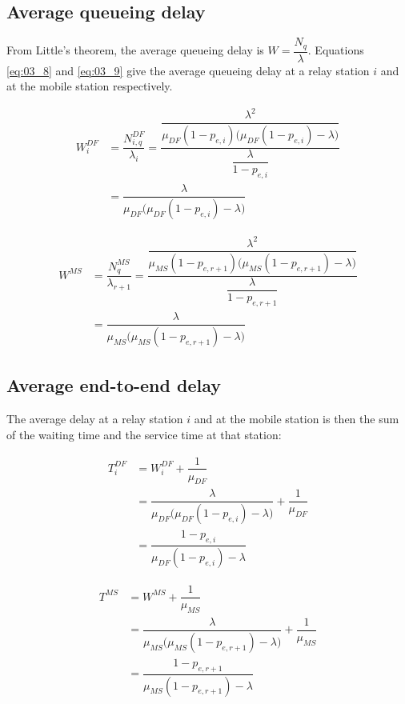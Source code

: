 \subsection{Average queueing delay}

From Little's theorem, the average queueing delay is $W = \dfrac{N_q}{\lambda}$.
Equations \ref{eq:03_8} and \ref{eq:03_9} give the average queueing delay at a
relay station $i$ and at the mobile station respectively.

\begin{align}
  W_i^{DF} &= \dfrac{N_{i,q}^{DF}}{\lambda_i} =
    \dfrac{\dfrac{\lambda^2}{\mu_{DF}(1 - p_{e,i})\Big(\mu_{DF}(1 - p_{e,i}) - \lambda\Big)}} {\dfrac{\lambda}{1-p_{e,i}}} \nonumber \\
         ~ &= \dfrac{\lambda}{\mu_{DF}\Big(\mu_{DF}(1 - p_{e,i})- \lambda\Big)}
  \label{eq:03_8}
\end{align}

\begin{align}
  W^{MS} &= \dfrac{N_q^{MS}}{\lambda_{r+1}} =
    \dfrac{\dfrac{\lambda^2}{\mu_{MS}(1 - p_{e,r+1})\Big(\mu_{MS}(1 - p_{e,r+1}) - \lambda\Big)}}{\dfrac{\lambda}{1-p_{e,r+1}}} \nonumber \\
       ~ &= \dfrac{\lambda}{\mu_{MS}\Big(\mu_{MS}(1 - p_{e,r+1})- \lambda\Big)}
  \label{eq:03_9}
\end{align}


\subsection{Average end-to-end delay}

The average delay at a relay station $i$ and at the mobile station is then the
sum of the waiting time and the service time at that station:

\begin{align*}
  T_i^{DF} &= W_i^{DF} + \dfrac{1}{\mu_{DF}} \\
         ~ &= \dfrac{\lambda}{\mu_{DF}\Big(\mu_{DF}(1 - p_{e,i})- \lambda\Big)} + \dfrac{1}{\mu_{DF}} \\
         ~ &= \dfrac{1-p_{e,i}}{\mu_{DF} (1 - p_{e,i}) - \lambda}
\end{align*}

\begin{align*}
  T^{MS} &= W^{MS} + \dfrac{1}{\mu_{MS}} \\
       ~ &= \dfrac{\lambda}{\mu_{MS}\Big(\mu_{MS}(1 - p_{e,r+1})- \lambda\Big)} + \dfrac{1}{\mu_{MS}} \\
       ~ &= \dfrac{1 - p_{e,r+1}}{\mu_{MS}(1 - p_{e,r+1}) - \lambda}
\end{align*}


